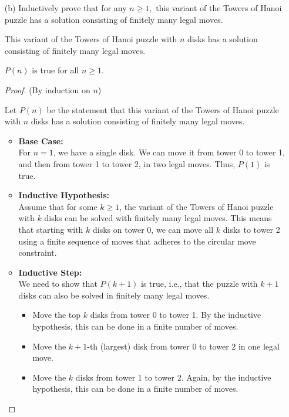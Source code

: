 \documentclass[12pt]{article}
\newcommand{\vs}{\vspace{2mm}}
\newcommand{\ls}{\vspace{5mm}}
\begin{document}
\begin{itemize}
\newpage

 \item[(b)]  Inductively prove that for any $n \geq 1,$ this variant of the Towers of Hanoi puzzle has a solution consisting of finitely many legal moves.
\vs\

 This variant of the Towers of Hanoi puzzle with $n$ disks has a solution consisting of finitely many legal moves. 
\ls\

 $P(n)$ is true for all $n \geq 1$.
\vs\

\begin{proof} (By induction on $n$)

    \noindent Let $P(n)$ be the statement that this variant of the Towers of Hanoi puzzle with $n$ disks has a solution consisting of finitely many legal moves.
    
    \begin{itemize}
        \item \textbf{Base Case:} \\
        For $n = 1$, we have a single disk. We can move it from tower 0 to tower 1, and then from tower 1 to tower 2, in two legal moves. Thus, $P(1)$ is true.
        
        \item \textbf{Inductive Hypothesis:} \\
        Assume that for some $k \geq 1$, the variant of the Towers of Hanoi puzzle with $k$ disks can be solved with finitely many legal moves. This means that starting with $k$ disks on tower 0, we can move all $k$ disks to tower 2 using a finite sequence of moves that adheres to the circular move constraint.
        
        \item \textbf{Inductive Step:} \\
        We need to show that $P(k+1)$ is true, i.e., that the puzzle with $k+1$ disks can also be solved in finitely many legal moves.
        
        \begin{itemize}
            \item Move the top $k$ disks from tower 0 to tower 1. By the inductive hypothesis, this can be done in a finite number of moves.
            \item Move the $k+1$-th (largest) disk from tower 0 to tower 2 in one legal move.
            \item Move the $k$ disks from tower 1 to tower 2. Again, by the inductive hypothesis, this can be done in a finite number of moves.
        \end{itemize}
        

\end{itemize}
\end{proof}
\end{itemize}
\end{document}

